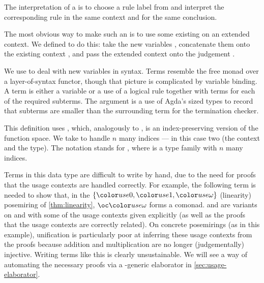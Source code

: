 
The interpretation of a  is to choose a rule label
 from  and interpret the corresponding rule
\AgdaSpace{} in the same context and for the same
conclusion.


The most obvious way to make such an  is to use some existing
 on an extended context.
We defined  to do this: take the new variables
\AgdaBound{$\Delta$}, concatenate them onto the existing context
\AgdaBound{$\Gamma$}, and pass the extended context onto the judgement
.



We use  to deal with new variables in syntax.
Terms resemble the free monad over a layer-of-syntax functor, though
that picture is complicated by variable binding.  A term is either a
variable or a use of a logical rule together with terms for each of
the required subterms. The  argument is a use of
Agda's sized types to record that subterms are smaller than the
surrounding term for the termination checker.


This definition uses \AgdaFunction{$\dotto$}, which, analogously to
\AgdaFunction{$\dottimes$}, is an index-preserving version of the function
space.
We take \AgdaFunction{$\dotto$} to handle $n$ many indices --- in this
case two (the context and the type).
The notation
\AgdaFunction{$\forall[$}\AgdaSpace{}\AgdaSpace{}\AgdaFunction{]}
stands for
\AgdaSymbol{$\forall$}\AgdaSpace{}\AgdaSymbol{\{}%
\AgdaSpace{}\AgdaSymbol{$\ldots$}\AgdaSpace{}%
\AgdaSymbol{\}}\AgdaSpace{}\AgdaSymbol{$\to$}\AgdaSpace{}%
\AgdaSpace{}%
\AgdaSpace{}\AgdaSymbol{$\ldots$}\AgdaSpace{},
where  is a type family with $n$ many indices.

Terms in this data type are difficult to write by hand, due to the
need for proofs that the usage contexts are handled correctly. For
example, the following term is needed to show that, in the $\{\gr0,
\gr1, \gr\omega\}$ (linearity) posemiring of \cref{thm:linearity},
$\oc\gr\omega$ forms a comonad.  and
 are variants on
 and  with
some of the usage contexts given explicitly (as well as the proofs
that the usage contexts are correctly related). On concrete
posemirings (as in this example), unification is particularly poor at
inferring these usage contexts from the proofs because addition and
multiplication are no longer (judgementally) injective.
 Writing terms like this
is clearly unsustainable. We will see a way of automating the
necessary proofs via a -generic elaborator in
\cref{sec:usage-elaborator}.

